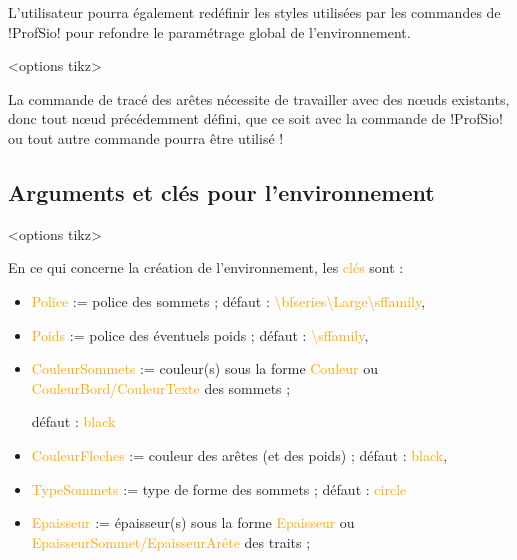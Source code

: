 \documentclass[french,a4paper,11pt]{article}
\newcommand\Cle[1]{{\small\sffamily\textlangle \textcolor{orange}{#1}\textrangle}}
\begin{document}
{{\begin{noteblock}
L'utilisateur pourra également redéfinir les styles utilisées par les commandes de \packagetex!ProfSio! pour refondre le paramétrage global de l'environnement.
\end{noteblock}

\begin{DemoCode}
\begin{GrapheTikz}[clés]<options tikz>
\end{GrapheTikz}
\end{DemoCode}

\begin{tipblock}
La commande de tracé des arêtes nécessite de travailler avec des nœuds existants, donc tout nœud précédemment défini, que ce soit avec la commande de \packagetex!ProfSio! ou tout autre commande pourra être utilisé !
\end{tipblock}

\subsection{Arguments et clés pour l'environnement}

\begin{DemoCode}
\begin{GrapheTikz}[clés]<options tikz>
\end{GrapheTikz}
\end{DemoCode}

\begin{tipblock}
En ce qui concerne la création de l'environnement, les \Cle{clés} sont :

\begin{itemize}
	\item \Cle{Police} := police des sommets ; \hfill{}défaut : \Cle{\textbackslash bfseries\textbackslash Large\textbackslash sffamily},%
	\item \Cle{Poids} := police des éventuels poids ; \hfill{}défaut : \Cle{\textbackslash sffamily},%
	\item \Cle{CouleurSommets} := couleur(s) sous la forme \Cle{Couleur} ou \Cle{CouleurBord/CouleurTexte} des sommets ;
	
	\hfill{}défaut : \Cle{black}
	\item \Cle{CouleurFleches} := couleur des arêtes (et des poids) ; \hfill{}défaut : \Cle{black},%
	\item \Cle{TypeSommets} := type de forme des sommets ; \hfill{}défaut : \Cle{circle}
	\item \Cle{Epaisseur} := épaisseur(s) sous la forme \Cle{Epaisseur} ou \Cle{EpaisseurSommet/EpaisseurArête} des traits ;
	

\end{itemize}
\end{tipblock}}}
\end{document}
